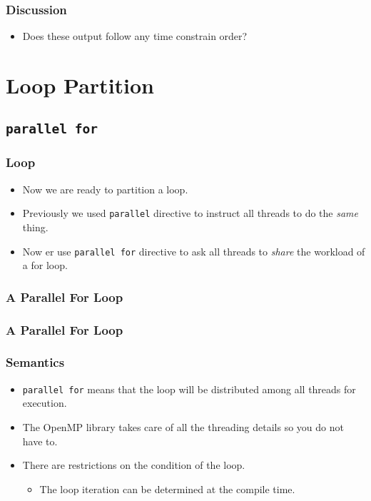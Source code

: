 \documentclass{beamer}
\begin{document}
\begin{frame}
\frametitle{Discussion}
\begin{itemize}
\item Does these output follow any time constrain order?
\end{itemize}
\end{frame}

\section{Loop Partition}

\subsection{\tt parallel for}

\begin{frame}
\frametitle{Loop}
\begin{itemize}
\item Now we are ready to partition a loop.
\item Previously we used {\tt parallel} directive to instruct all
  threads to do the {\em same} thing.
\item Now er use {\tt parallel for} directive to ask all threads to
  {\em share} the workload of a for loop.
\end{itemize}
\end{frame}

\begin{frame}
\frametitle{A Parallel For Loop}
\end{frame}

\begin{frame}
\frametitle{A Parallel For Loop}
\frametitle{Semantics}
\begin{itemize}
\item {\tt parallel for} means that the loop will be distributed among
  all threads for execution.
\item The OpenMP library takes care of all the threading details so
  you do not have to.
\item There are restrictions on the condition of the loop.  
\begin{itemize}
\item The loop iteration can be determined at the compile time.
\end{itemize}
\end{itemize}
\end{frame}
\end{document}
